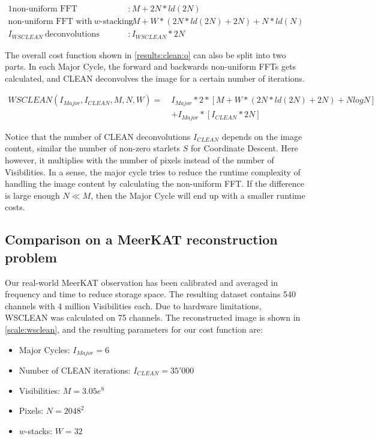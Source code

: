 \begin{alignat*}{1}
	\text{non-uniform FFT} &: M + 2N*ld(2N)\\
	\text{non-uniform FFT with} \:w\text{-stacking} &:M + W*(2N*ld(2N) + 2N) + N*ld(N)\\
	I_{WSCLEAN}\: \text{deconvolutions} &: I_{WSCLEAN}*2N
\end{alignat*}

The overall cost function shown in \eqref{results:clean:o} can also be split into two parts. In each Major Cycle, the forward and backwards non-uniform FFTs gets calculated, and CLEAN deconvolves the image for a certain number of iterations.

\begin{equation}\label{results:clean:o}
\begin{aligned}
 WSCLEAN(I_{Major}, I_{CLEAN}, M, N,  W) =\: &I_{Major} * 2 * [M + W*(2N*ld(2N) + 2N) + N log N]\\
	&+ I_{Major} * [I_{CLEAN}*2N]
\end{aligned}
\end{equation}

Notice that the number of CLEAN deconvolutions $I_{CLEAN}$ depends on the image content, similar the number of non-zero starlets $S$ for Coordinate Descent. Here however, it multiplies with the number of pixels instead of the number of Visibilities. In a sense, the major cycle tries to reduce the runtime complexity of handling the image content by calculating the non-uniform FFT. If the difference is large enough $N \ll M$, then the Major Cycle will end up with a smaller runtime costs.


\subsection{Comparison on a MeerKAT reconstruction problem}
Our real-world MeerKAT observation has been calibrated and averaged in frequency and time to reduce storage space. The resulting dataset contains 540 channels with 4 million Visibilities each. Due to hardware limitations, WSCLEAN was calculated on 75 channels. The reconstructed image is shown in \ref{scale:wsclean}, and the resulting parameters for our cost function are: 
\begin{itemize}
	\item Major Cycles: $I_{Major} = 6$
	\item Number of CLEAN iterations: $I_{CLEAN} = 35'000$
	\item Visibilities: $M=3.05e^8$
		\item Pixels: $N = 2048^2$
	\item $w$-stacks: $W = 32$
\end{itemize}

